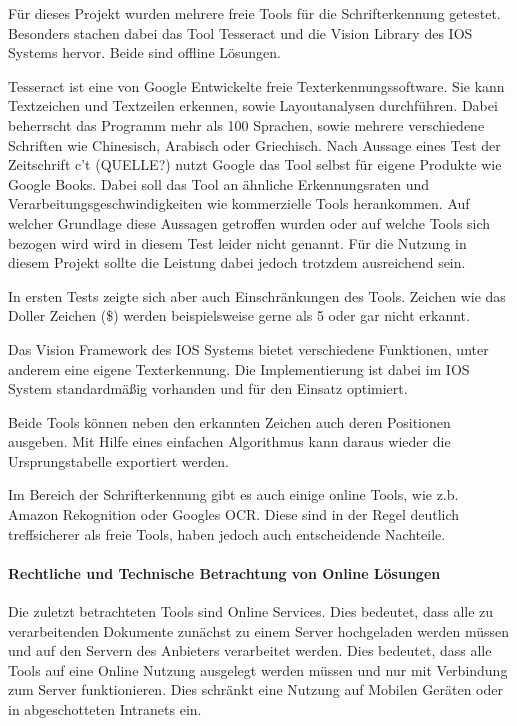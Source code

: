\documentclass[
]{article}
\begin{document}
Für dieses Projekt wurden mehrere freie Tools für die Schrifterkennung
getestet. Besonders stachen dabei das Tool Tesseract und die Vision
Library des IOS Systems hervor. Beide sind offline Lösungen.

Tesseract ist eine von Google Entwickelte freie Texterkennungssoftware.
Sie kann Textzeichen und Textzeilen erkennen, sowie Layoutanalysen
durchführen. Dabei beherrscht das Programm mehr als 100 Sprachen, sowie
mehrere verschiedene Schriften wie Chinesisch, Arabisch oder Griechisch.
Nach Aussage eines Test der Zeitschrift c't (QUELLE?) nutzt Google das
Tool selbst für eigene Produkte wie Google Books. Dabei soll das Tool an
ähnliche Erkennungsraten und Verarbeitungsgeschwindigkeiten wie
kommerzielle Tools herankommen. Auf welcher Grundlage diese Aussagen
getroffen wurden oder auf welche Tools sich bezogen wird wird in diesem
Test leider nicht genannt. Für die Nutzung in diesem Projekt sollte die
Leistung dabei jedoch trotzdem ausreichend sein.

In ersten Tests zeigte sich aber auch Einschränkungen des Tools. Zeichen
wie das Doller Zeichen (\$) werden beispielsweise gerne als 5 oder gar
nicht erkannt.

Das Vision Framework des IOS Systems bietet verschiedene Funktionen,
unter anderem eine eigene Texterkennung. Die Implementierung ist dabei
im IOS System standardmäßig vorhanden und für den Einsatz optimiert.

Beide Tools können neben den erkannten Zeichen auch deren Positionen
ausgeben. Mit Hilfe eines einfachen Algorithmus kann daraus wieder die
Ursprungstabelle exportiert werden.

Im Bereich der Schrifterkennung gibt es auch einige online Tools, wie
z.b. Amazon Rekognition oder Googles OCR. Diese sind in der Regel
deutlich treffsicherer als freie Tools, haben jedoch auch entscheidende
Nachteile.

\hypertarget{header-n158}{%
\paragraph{Rechtliche und Technische Betrachtung von Online
Lösungen}\label{header-n158}}

Die zuletzt betrachteten Tools sind Online Services. Dies bedeutet, dass
alle zu verarbeitenden Dokumente zunächst zu einem Server hochgeladen
werden müssen und auf den Servern des Anbieters verarbeitet werden. Dies
bedeutet, dass alle Tools auf eine Online Nutzung ausgelegt werden
müssen und nur mit Verbindung zum Server funktionieren. Dies schränkt
eine Nutzung auf Mobilen Geräten oder in abgeschotteten Intranets ein.
\end{document}
